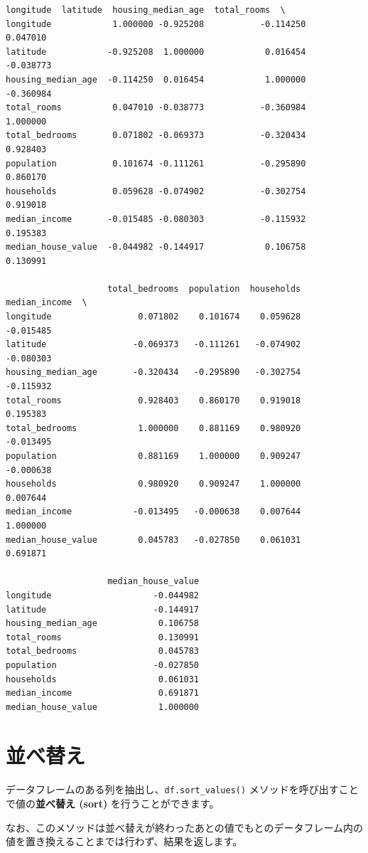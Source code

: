 \begin{lstlisting}[style=outputcell]
                    longitude  latitude  housing_median_age  total_rooms  \
longitude            1.000000 -0.925208           -0.114250     0.047010   
latitude            -0.925208  1.000000            0.016454    -0.038773   
housing_median_age  -0.114250  0.016454            1.000000    -0.360984   
total_rooms          0.047010 -0.038773           -0.360984     1.000000   
total_bedrooms       0.071802 -0.069373           -0.320434     0.928403   
population           0.101674 -0.111261           -0.295890     0.860170   
households           0.059628 -0.074902           -0.302754     0.919018   
median_income       -0.015485 -0.080303           -0.115932     0.195383   
median_house_value  -0.044982 -0.144917            0.106758     0.130991   

                    total_bedrooms  population  households  median_income  \
longitude                 0.071802    0.101674    0.059628      -0.015485   
latitude                 -0.069373   -0.111261   -0.074902      -0.080303   
housing_median_age       -0.320434   -0.295890   -0.302754      -0.115932   
total_rooms               0.928403    0.860170    0.919018       0.195383   
total_bedrooms            1.000000    0.881169    0.980920      -0.013495   
population                0.881169    1.000000    0.909247      -0.000638   
households                0.980920    0.909247    1.000000       0.007644   
median_income            -0.013495   -0.000638    0.007644       1.000000   
median_house_value        0.045783   -0.027850    0.061031       0.691871   

                    median_house_value  
longitude                    -0.044982  
latitude                     -0.144917  
housing_median_age            0.106758  
total_rooms                   0.130991  
total_bedrooms                0.045783  
population                   -0.027850  
households                    0.061031  
median_income                 0.691871  
median_house_value            1.000000  
\end{lstlisting}

\section{並べ替え}


データフレームのある列を抽出し、\texttt{df.sort\_values()} メソッドを呼び出すことで値の\textbf{並べ替え (sort)} を行うことができます。

なお、このメソッドは並べ替えが終わったあとの値でもとのデータフレーム内の値を置き換えることまでは行わず、結果を返します。

